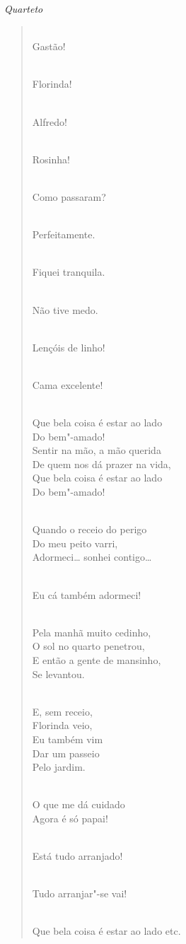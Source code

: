 {\smallskip\raggedleft\itshape Quarteto\par}
\begin{verse}
\\
Gastão!

\\
Florinda!

\\
Alfredo!

\\
Rosinha!

\\
Como passaram?

\\
Perfeitamente.

\\
Fiquei tranquila.

\\
Não tive medo.


\\
Lençóis de linho!

\\
Cama excelente!

\\
Que bela coisa é estar ao lado\\
Do bem"-amado!\\
Sentir na mão, a mão querida\\
De quem nos dá prazer na vida,\\
Que bela coisa é estar ao lado\\
Do bem"-amado!

\\
Quando o receio do perigo\\
Do meu peito varri,\\
Adormeci\ldots{} sonhei contigo\ldots{}

\\
Eu cá também adormeci!

\\
Pela manhã muito cedinho,\\
O sol no quarto penetrou,\\
E então a gente de mansinho,\\
Se levantou.

\\
E, sem receio,\\
Florinda veio,\\
Eu também vim\\
Dar um passeio\\
Pelo jardim.

\\
O que me dá cuidado\\  
Agora é só papai!

\\
Está tudo arranjado!

\\
Tudo arranjar"-se vai!

\\
Que bela coisa é estar ao lado etc.
\end{verse}


